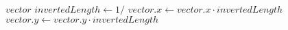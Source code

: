 \begin{algorithm}[!ht]
\caption{}
\label{alg:vectornormalized}
	\begin{algorithmic}[1]
		\Require $\mathit{vector}$
		\State $\mathit{invertedLength} \gets 1 /$ 
		\State $\mathit{vector.x} \gets \mathit{vector.x} \cdot \mathit{invertedLength}$
		\State $\mathit{vector.y} \gets \mathit{vector.y} \cdot \mathit{invertedLength}$
	\end{algorithmic}
\end{algorithm}
